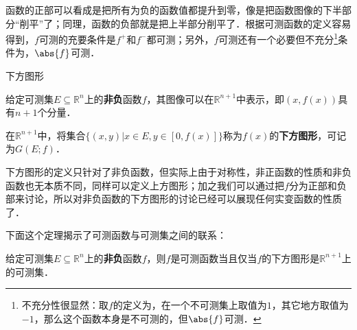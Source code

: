 函数的正部可以看成是把所有为负的函数值都提升到零，像是把函数图像的下半部分“削平”了；同理，函数的负部就是把上半部分削平了．根据可测函数的定义容易得到，$f$可测的充要条件是$f^+$和$f^-$都可测；另外，$f$可测还有一个必要但不充分\footnote{不充分性很显然：取$f$的定义为，在一个不可测集上取值为$1$，其它地方取值为$-1$，那么这个函数本身是不可测的，但$\abs{f}$可测．}条件为，$\abs{f}$可测．

\begin{definition}{下方图形}

给定可测集$E\subseteq\mathbb{R}^n$上的\textbf{非负}函数$f$，其图像可以在$\mathbb{R}^{n+1}$中表示，即$(x, f(x))$具有$n+1$个分量．

在$\mathbb{R}^{n+1}$中，将集合$\{(x, y)|x\in E, y\in [0, f(x)]\}$称为$f(x)$的\textbf{下方图形}，可记为$G(E; f)$．

\end{definition}

下方图形的定义只针对了非负函数，但实际上由于对称性，非正函数的性质和非负函数也无本质不同，同样可以定义上方图形；加之我们可以通过把$f$分为正部和负部来讨论，所以对非负函数的下方图形的讨论已经可以展现任何实变函数的性质了．

下面这个定理揭示了可测函数与可测集之间的联系：

\begin{theorem}{}

给定可测集$E\subseteq\mathbb{R}^n$上的\textbf{非负}函数$f$，则$f$是可测函数当且仅当$f$的下方图形是$\mathbb{R}^{n+1}$上的可测集．

\end{theorem}





